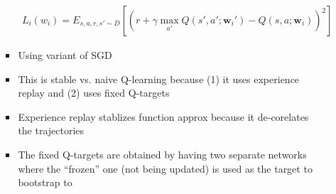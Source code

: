 \documentclass[12pt]{article}
\begin{document}
\begin{itemize}
\begin{itemize}
\begin{itemize}
\begin{gather*}
          L_i(w_i) = E_{s, a, r, s' \sim D}[(r + \gamma \max\limits_{a'}Q(s', a'; \textbf{w}_i') - Q(s, a; \textbf{w}_i))^2]
        \end{gather*}
        \item Using variant of SGD
        \item This is stable vs. naive Q-learning because (1) it uses experience replay and (2) uses fixed Q-targets
        \item Experience replay stablizes function approx because it de-corelates the trajectories
        \item The fixed Q-targets are obtained by having two separate networks where the ``frozen'' one (not being updated) is used as the target to bootstrap to
      \end{itemize}
    \end{itemize}
  \end{itemize}
\end{document}
